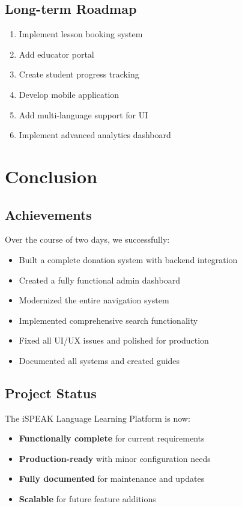 \documentclass[11pt,a4paper]{article}
\begin{document}
\subsection{Long-term Roadmap}
\begin{enumerate}[leftmargin=*,itemsep=5pt]
    \item Implement lesson booking system
    \item Add educator portal
    \item Create student progress tracking
    \item Develop mobile application
    \item Add multi-language support for UI
    \item Implement advanced analytics dashboard
\end{enumerate}

\section{Conclusion}

\subsection{Achievements}
Over the course of two days, we successfully:
\begin{itemize}[leftmargin=*,itemsep=5pt]
    \item Built a complete donation system with backend integration
    \item Created a fully functional admin dashboard
    \item Modernized the entire navigation system
    \item Implemented comprehensive search functionality
    \item Fixed all UI/UX issues and polished for production
    \item Documented all systems and created guides
\end{itemize}

\subsection{Project Status}
The iSPEAK Language Learning Platform is now:
\begin{itemize}[leftmargin=*,itemsep=5pt]
    \item \textbf{Functionally complete} for current requirements
    \item \textbf{Production-ready} with minor configuration needs
    \item \textbf{Fully documented} for maintenance and updates
    \item \textbf{Scalable} for future feature additions
\end{itemize}
\end{document}
